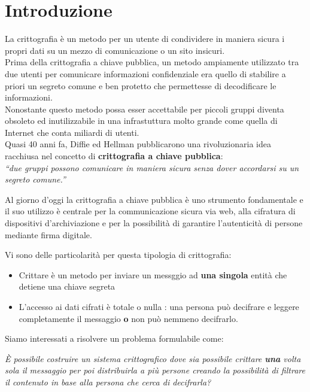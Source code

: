 
\chapter{Introduzione}


La crittografia è un metodo per un utente di condividere in maniera sicura i propri dati su un mezzo di comunicazione o un sito insicuri.\\
Prima della crittografia a chiave pubblica, un metodo ampiamente utilizzato tra due utenti per comunicare informazioni confidenziale era quello di stabilire a priori un segreto comune e ben protetto che permettesse di decodificare le informazioni.\\
Nonostante questo metodo possa esser accettabile per piccoli gruppi diventa obsoleto ed inutilizzabile in una infrastuttura molto grande come quella di Internet che conta miliardi di utenti.\\

Quasi 40 anni fa, Diffie ed Hellman pubblicarono una rivoluzionaria idea racchiusa nel concetto di \textbf{crittografia a chiave pubblica}:\\
{ \itshape ``due gruppi possono comunicare in maniera sicura \emph{senza} dover accordarsi su un segreto comune.''}

\vspace{0.4cm}

Al giorno d'oggi la crittografia a chiave pubblica è uno strumento fondamentale e il suo utilizzo è centrale per la communicazione sicura via web, alla cifratura di dispositivi d'archiviazione e per la possibilità di garantire l'autenticità di persone mediante firma digitale.


Vi sono delle particolarità per questa tipologia di crittografia:
\begin{itemize}
	\item Crittare è un metodo per inviare un messggio ad \textbf{una singola} entità che detiene una chiave segreta
	\item L'accesso ai dati cifrati è totale o nulla : una persona può decifrare e leggere completamente il messaggio \textbf{o} non può nemmeno decifrarlo.
\end{itemize}

\vspace{1cm}
Siamo interessati a risolvere un problema formulabile come:

\begin{center}
{\itshape È possibile costruire un sistema crittografico dove sia possibile crittare \textbf{una} volta sola il messaggio per poi distribuirla a più persone creando la possibilità di filtrare il contenuto in base alla persona che cerca di decifrarla?}
\end{center}
\newpage

